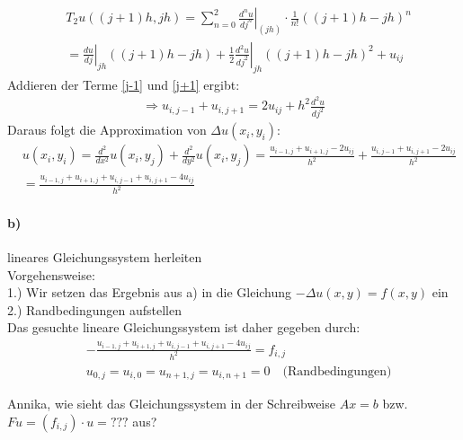 \begin{align}
&T_2 u((j+1)h, jh)=\sum_{n=0}^2 \left. \frac{d^n u}{dj^n} \right|_{(jh)} \cdot \frac{1}{n!}((j+1)h-jh)^n\\ &=\left.\frac{du}{dj}\right |_{jh} ((j+1)h-jh)+\left.\frac{1}{2}\frac{d^2u}{dj^2}\right|_{jh}((j+1)h-jh)^2+u_{ij}\label{j+1}
\end{align}
Addieren der Terme \eqref{j-1} und \eqref{j+1} ergibt:
\begin{align*}
\Rightarrow u_{i, j-1}+u_{i, j+1}=2u_{ij} + h^2 \frac{d^2u}{dj^2}
\end{align*}
Daraus folgt die Approximation von $\Delta u(x_i,y_i)$:
\begin{align*}
&u(x_i, y_i)=\frac{d^2}{dx^2}u(x_i,y_j)+\frac{d^2}{dy^2}u(x_i,y_j)=\frac{u_{i-1,j}+u_{i+1,j}-2u_{ij}}{h^2}+\frac{u_{i, j-1}+u_{i, j+1}-2u_{ij}}{h^2}\\
&=\frac{u_{i-1,j}+u_{i+1,j}+u_{i, j-1}+u_{i, j+1}-4u_{ij}}{h^2}
\end{align*}
\paragraph*{b)}
lineares Gleichungssystem herleiten\\
\newline
Vorgehensweise:\\
1.) Wir setzen das Ergebnis aus a) in die Gleichung $-\Delta u(x,y)=f(x,y)$ ein\\
2.) Randbedingungen aufstellen\\
\newline
Das gesuchte lineare Gleichungssystem ist daher gegeben durch:
\begin{align*}
&-\frac{u_{i-1,j}+u_{i+1,j}+u_{i, j-1}+u_{i, j+1}-4u_{ij}}{h^2}=f_{i,j}\\
&u_{0,j}=u_{i,0}=u_{n+1,j}=u_{i,n+1}=0 \quad\text{(Randbedingungen)}
\end{align*}

Annika, wie sieht das Gleichungssystem in der Schreibweise $A x = b$ bzw.
$F u = (f_{i,j}) \cdot u = ???$ aus?

